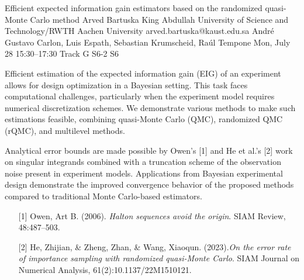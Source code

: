 \begin{talk}
  {Efficient expected information gain estimators based on the randomized quasi-Monte Carlo method}%
  {Arved Bartuska}%
  {King Abdullah University of Science and Technology/RWTH Aachen University}%
  {arved.bartuska@kaust.edu.sa}%
  {Andr\'{e} Gustavo Carlon, Luis Espath, Sebastian Krumscheid, Ra\'{u}l Tempone}%
  {}%
  {Mon, July 28 15:30–17:30 Track G}%
  {S6-2}%
  {S6}%
  
				
			
Efficient estimation of the expected information gain (EIG) of an experiment allows for design optimization in a Bayesian setting. This task faces computational challenges, particularly when the experiment model requires numerical discretization schemes. We demonstrate various methods to make such estimations feasible, combining quasi-Monte Carlo (QMC), randomized QMC (rQMC), and multilevel methods.

Analytical error bounds are made possible by Owen's [1] and He et al.'s [2] work on singular integrands combined with a truncation scheme of the observation noise present in experiment models. Applications from Bayesian experimental design demonstrate the improved convergence behavior of the proposed methods compared to traditional Monte Carlo-based estimators.

\medskip

\begin{enumerate}
	\item[{[1]}] Owen, Art B. (2006). {\it Halton sequences avoid the origin}. SIAM Review, 48:487–503.
	\item[{[2]}] He, Zhijian, \& Zheng, Zhan, \& Wang, Xiaoqun. (2023).{\it On the error rate of importance sampling with randomized quasi-Monte Carlo}. SIAM Journal
on Numerical Analysis,  61(2):10.1137/22M1510121.
\end{enumerate}

\end{talk}


